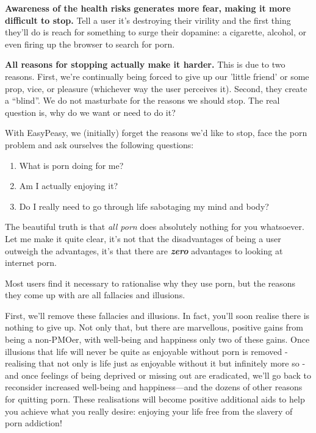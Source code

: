 \documentclass[
]{book}
\begin{document}
\textbf{Awareness of the health risks generates more fear, making it more difficult to stop.}
Tell a user it's destroying their virility and the first thing they'll do is reach for something to surge their dopamine: a cigarette, alcohol, or even firing up the browser to search for porn.

\textbf{All reasons for stopping actually make it harder.}
This is due to two reasons. First, we're continually being forced to give up our 'little friend' or some prop, vice, or pleasure (whichever way the user perceives it). Second, they create a ``blind''. We do not masturbate for the reasons we should stop. The real question is, why do we want or need to do it?

With EasyPeasy, we (initially) forget the reasons we'd like to stop, face the porn problem and ask ourselves the following questions:

\begin{enumerate}
\def\labelenumi{\arabic{enumi}.}
\item
  What is porn doing for me?
\item
  Am I actually enjoying it?
\item
  Do I really need to go through life sabotaging my mind and body?
\end{enumerate}

The beautiful truth is that \emph{all porn} does absolutely nothing for you whatsoever. Let me make it quite clear, it's not that the disadvantages of being a user outweigh the advantages, it's that there are \textbf{\emph{zero}} advantages to looking at internet porn.

Most users find it necessary to rationalise why they use porn, but the reasons they come up with are all fallacies and illusions.

First, we'll remove these fallacies and illusions. In fact, you'll soon realise there is nothing to give up. Not only that, but there are marvellous, positive gains from being a non-PMOer, with well-being and happiness only two of these gains. Once illusions that life will never be quite as enjoyable without porn is removed - realising that not only is life just as enjoyable without it but infinitely more so - and once feelings of being deprived or missing out are eradicated, we'll go back to reconsider increased well-being and happiness---and the dozens of other reasons for quitting porn. These realisations will become positive additional aids to help you achieve what you really desire: enjoying your life free from the slavery of porn addiction!
\end{document}
